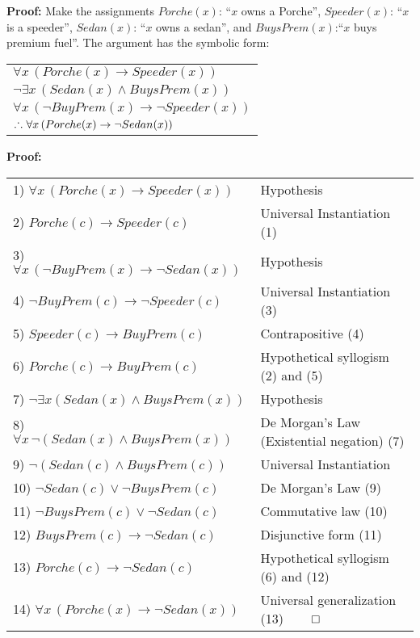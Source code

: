 \begin{Solution}{4.2}
\quad

\textbf{Proof:}
Make the assignments $Porche(x)$: ``$x$ owns a Porche'',  $Speeder(x)$: ``$x$ is a speeder'',  $Sedan(x)$: ``$x$ owns a sedan'', \newline
and  $BuysPrem(x)$:``$x$ buys premium fuel''. The argument has the symbolic form:

\begin{tabular}[t]{l}
$\forall{x}\,(Porche(x) \to Speeder(x))$ \\
$\lnot\exists{x}\,(Sedan(x) \land BuysPrem(x))$ \\
$\forall{x}\,(\lnot BuyPrem(x) \to \lnot Speeder(x))$\\
\hline
$\thus \forall{x}\,(Porche(x) \to \lnot Sedan(x))$
\end{tabular}

\vspace*{0.25cm}
          \textbf{Proof:}
	\begin{tabular}[t]{l l}
          1) $\forall{x}\,(Porche(x) \to Speeder(x))$                        & Hypothesis \\
          2) $Porche(c) \to Speeder(c)$                                           & Universal Instantiation (1) \\
          3) $\forall{x}\,(\lnot BuyPrem(x) \to \lnot Sedan(x))$     & Hypothesis \\
          4) $\lnot BuyPrem(c) \to \lnot Speeder(c)$                    & Universal Instantiation (3) \\
          5) $Speeder(c) \to BuyPrem(c)$                                       & Contrapositive (4) \\
          6) $Porche(c) \to BuyPrem(c)$                                         & Hypothetical syllogism (2) and (5) \\
          7) $\lnot \exists{x}(Sedan(x) \land BuysPrem(x))$        & Hypothesis \\
          8) $\forall{x}\,\lnot(Sedan(x) \land BuysPrem(x))$          & De Morgan's Law (Existential negation) (7) \\
          9) $\lnot(Sedan(c) \land BuysPrem(c))$                          & Universal Instantiation \\
        10) $\lnot Sedan(c) \lor \lnot BuysPrem(c)$                     & De Morgan's Law (9) \\
        11) $\lnot BuysPrem(c) \lor \lnot Sedan(c)$                     & Commutative law (10) \\
       12) $BuysPrem(c) \to \lnot Sedan(c)$                                 & Disjunctive form (11) \\
       13) $Porche(c) \to \lnot Sedan(c)$                                       & Hypothetical syllogism (6) and (12) \\
       14) $\forall{x}\,(Porche(x) \to \lnot Sedan(x))$                     & Universal generalization (13) $\qedhere$
\end{tabular}

\end{Solution}

